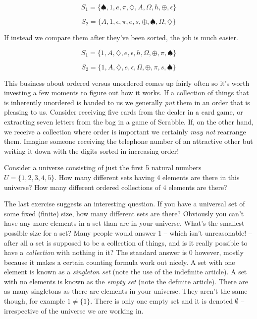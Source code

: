 \vfill

\[ S_1 = \{ \spadesuit, 1, e, \pi, \diamondsuit, A, \Omega, h, \oplus, \epsilon \} \]

\vfill

\[ S_2 = \{ A, 1, \epsilon, \pi, e, s, \oplus,  \spadesuit, \Omega, \diamondsuit \} \]

\newpage
If instead we compare them after they've been sorted, the job is much easier.

\[ S_1 = \{1, A, \diamondsuit, e, \epsilon, h, \Omega, \oplus, \pi, \spadesuit \} \]

\[ S_2 = \{1, A, \diamondsuit, e, \epsilon, \Omega, \oplus, \pi, s, \spadesuit \} \]

This business about ordered versus unordered comes up fairly often so it's 
worth investing a few moments to figure out how it works.  If a collection
of things that is inherently unordered is handed to us we generally \emph{put}
them in an order that is pleasing to us.  Consider receiving five cards
from the dealer in a card game, or extracting seven letters from the bag 
in a game of Scrabble.  If, on the other hand, we receive 
a collection where order
is important we certainly \emph{may not} rearrange them.  Imagine someone
receiving the telephone number of an attractive other but writing it down
with the digits sorted in increasing order!  

\begin{exer}
Consider a universe consisting of just the first 5 natural numbers
$U = \{ 1, 2, 3, 4, 5 \}$.  How many different sets having 4 elements
are there in this universe?  How many different ordered collections of 4 
elements are there? 
\end{exer}

The last exercise suggests an interesting question.  If you have 
a universal set of some fixed (finite) size, how many different sets
are there?  Obviously you can't have any more elements in a set than
are in your universe.  What's the smallest possible size for a set?
Many people would answer 1 -- which isn't unreasonable! -- after all
a set is supposed to be a collection of things, and is it really possible
to have a \emph{collection} with nothing in it?  The standard answer is
0 however, mostly because it makes a certain counting formula work out
nicely.  A set with one element is known as a 
\emph{singleton set} 
(note the use of the indefinite article).  A set with no elements
is known as the 
\emph{empty set} (note the definite article).  There
are as many singletons as there are elements in your universe.  They
aren't the same though, for example $1 \neq \{ 1 \}$.  There is 
only one empty set and it is denoted $\emptyset$ -- irrespective of the
universe we are working in.

